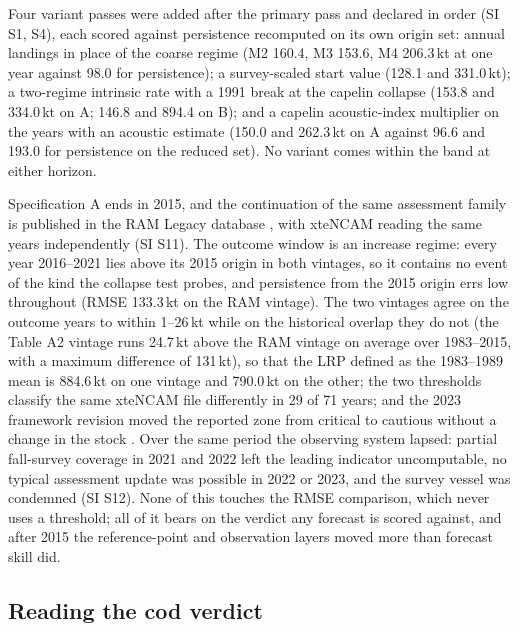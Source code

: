 \documentclass[preprint,11pt,authoryear]{elsarticle}
\theoremstyle{definition}
\theoremstyle{remark}
\begin{document}
Four variant passes were added after the primary pass and declared in order (SI S1, S4), each scored against persistence recomputed on its own origin set: annual landings in place of the coarse regime (M2 160.4, M3 153.6, M4 206.3\,kt at one year against 98.0 for persistence); a survey-scaled start value (128.1 and 331.0\,kt); a two-regime intrinsic rate with a 1991 break at the capelin collapse \citep{Buren2014,DFO2024b} (153.8 and 334.0\,kt on A; 146.8 and 894.4 on B); and a capelin acoustic-index multiplier on the years with an acoustic estimate \citep{Murphy2025,NAFC2025} (150.0 and 262.3\,kt on A against 96.6 and 193.0 for persistence on the reduced set). No variant comes within the band at either horizon.

Specification A ends in 2015, and the continuation of the same assessment family is published in the RAM Legacy database \citep[v4.66, stock COD2J3KL;][]{Ricard2012}, with xteNCAM reading the same years independently (SI S11). The outcome window is an increase regime: every year 2016--2021 lies above its 2015 origin in both vintages, so it contains no event of the kind the collapse test probes, and persistence from the 2015 origin errs low throughout (RMSE 133.3\,kt on the RAM vintage). The two vintages agree on the outcome years to within 1--26\,kt while on the historical overlap they do not (the Table A2 vintage runs 24.7\,kt above the RAM vintage on average over 1983--2015, with a maximum difference of 131\,kt), so that the LRP defined as the 1983--1989 mean is 884.6\,kt on one vintage and 790.0\,kt on the other; the two thresholds classify the same xteNCAM file differently in 29 of 71 years; and the 2023 framework revision moved the reported zone from critical to cautious without a change in the stock \citep{DFO2024a,Regular2025}. Over the same period the observing system lapsed: partial fall-survey coverage in 2021 and 2022 left the leading indicator uncomputable, no typical assessment update was possible in 2022 or 2023, and the survey vessel was condemned (SI S12). None of this touches the RMSE comparison, which never uses a threshold; all of it bears on the verdict any forecast is scored against, and after 2015 the reference-point and observation layers moved more than forecast skill did.

\subsection{Reading the cod verdict}\label{sec:codreading}
\end{document}
